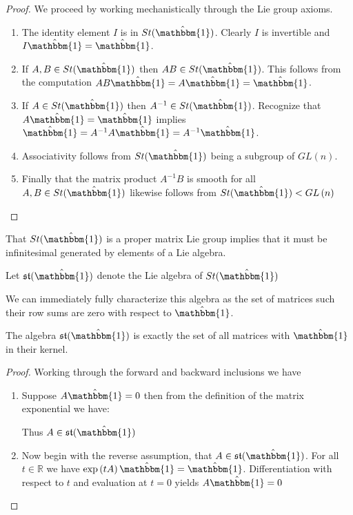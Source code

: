 \begin{proof}
	We proceed by working mechanistically through the Lie group axioms.
	\begin{enumerate}
		\item The identity element $I$ is in $St(\hat{\mathbbm{1}})$. Clearly $I$ is
		invertible and $I \hat{\mathbbm{1}} = \hat{\mathbbm{1}}$.
		\item If $A,B \in St(\hat{\mathbbm{1}})$ then $AB \in St(\hat{\mathbbm{1}})$. 
		This follows from the computation $AB \hat{\mathbbm{1}} = A \hat{\mathbbm{1}} = \hat{\mathbbm{1}}$.
		\item If $A \in St(\hat{\mathbbm{1}})$ then $A^{-1} \in St(\hat{\mathbbm{1}})$.
		Recognize that $A \hat{\mathbbm{1}} = \hat{\mathbbm{1}}$ implies $\hat{\mathbbm{1}} = A^{-1} A \hat{\mathbbm{1}} = A^{-1} \hat{\mathbbm{1}}$.
		\item Associativity follows from $St(\hat{\mathbbm{1}})$ being a subgroup of $GL\left(n\right)$.
		\item Finally that the matrix product $A^{-1}B$ is smooth for all $A,B \in St(\hat{\mathbbm{1}})$
		likewise follows from $St(\hat{\mathbbm{1}}) < GL\left(n\right)$
	\end{enumerate}
\end{proof}

That $St(\hat{\mathbbm{1}})$ is a proper matrix Lie group implies that it must be
infinitesimal generated by elements of a Lie algebra.

\begin{definition}
	Let $\mathfrak{st}(\hat{\mathbbm{1}})$ denote the Lie algebra of $St(\hat{\mathbbm{1}})$
\end{definition}

We can immediately fully characterize this algebra as the set of matrices such
their row sums are zero with respect to $\hat{\mathbbm{1}}$.

\begin{lemma}
	The algebra $\mathfrak{st}(\hat{\mathbbm{1}})$ is exactly the set of all 
	matrices with $\hat{\mathbbm{1}}$ in their kernel.
\end{lemma}

\begin{proof}
	Working through the forward and backward inclusions we have
	\begin{enumerate}
		\item Suppose $A \hat{\mathbbm{1}} = 0$ then from the definition of the 
		matrix exponential we have:
		
		Thus $A \in \mathfrak{st}(\hat{\mathbbm{1}})$
		\item Now begin with the reverse assumption, that $A \in \mathfrak{st}(\hat{\mathbbm{1}})$.
		For all $t \in \mathbb{R}$ we have $\exp\left(tA\right) \hat{\mathbbm{1}}= \hat{\mathbbm{1}}$.
		Differentiation with respect to $t$ and evaluation at $t = 0$ yields $A \hat{\mathbbm{1}} = 0$
		
	\end{enumerate}
\end{proof}

